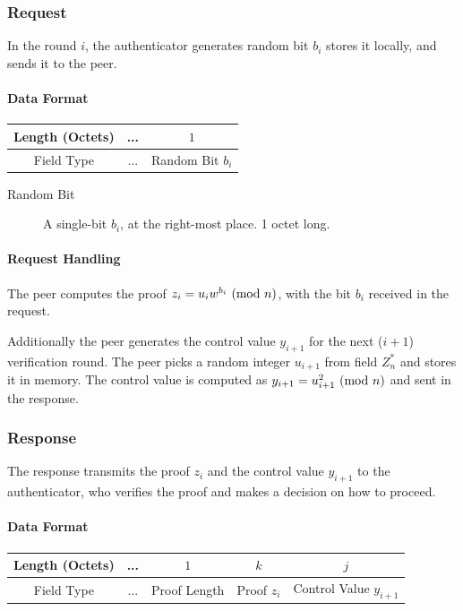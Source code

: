 \subsubsection{Request}
In the round $i$, the authenticator generates random bit $b_i$ stores it locally, and sends it to the peer.
\paragraph{Data Format}

\begin{center}
\begin{tabular}{|c|c|c|}
	\hline
	Length (Octets) & ... & $1$ \\
	\hline
	Field Type & ... & Random Bit $b_i$\\
	\hline
\end{tabular}
\end{center}

\begin{description}
	\item[Random Bit] A single-bit $b_i$, at the right-most place. 1 octet long.
\end{description}

\paragraph{Request Handling}
The peer computes the proof $z_i = u_iw^{b_i} \ (\mathrm{mod}\ n)$, with the bit $b_i$ received in the request.

Additionally the peer generates the control value $y_{i+1}$ for the next ($i+1$) verification round.
The peer picks a random integer $u_{i+1}$ from field $Z^*_n$ and stores it in memory.
The control value is computed as $y_{i+1} = u_{i+1}^2 \ (\mathrm{mod}\ n)$ and sent in the response.

\subsubsection{Response}

The response transmits the proof $z_i$ and the control value $y_{i+1}$ to the authenticator, who verifies the proof and makes a decision on how to proceed.
\paragraph{Data Format}

\begin{center}
\begin{tabular}{|c|c|c|c|c|}
	\hline
	Length (Octets) & ... & $1$ & $k $ & $j$\\
	\hline
	Field Type & ... & Proof Length & Proof $z_i$ & Control Value $y_{i+1}$\\ %
	\hline
\end{tabular}
\end{center}

